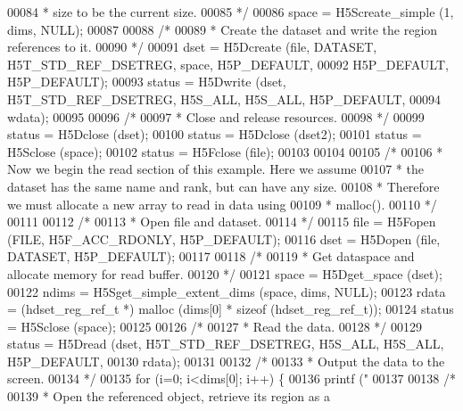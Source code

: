 \begin{DoxyCode}
00084 \textcolor{comment}{     * size to be the current size.}
00085 \textcolor{comment}{     */}
00086     space = H5Screate\_simple (1, dims, NULL);
00087 
00088     \textcolor{comment}{/*}
00089 \textcolor{comment}{     * Create the dataset and write the region references to it.}
00090 \textcolor{comment}{     */}
00091     dset = H5Dcreate (file, DATASET, H5T\_STD\_REF\_DSETREG, space, H5P\_DEFAULT,
00092                 H5P\_DEFAULT, H5P\_DEFAULT);
00093     status = H5Dwrite (dset, H5T\_STD\_REF\_DSETREG, H5S\_ALL, H5S\_ALL, H5P\_DEFAULT,
00094                 wdata);
00095 
00096     \textcolor{comment}{/*}
00097 \textcolor{comment}{     * Close and release resources.}
00098 \textcolor{comment}{     */}
00099     status = H5Dclose (dset);
00100     status = H5Dclose (dset2);
00101     status = H5Sclose (space);
00102     status = H5Fclose (file);
00103 
00104 
00105     \textcolor{comment}{/*}
00106 \textcolor{comment}{     * Now we begin the read section of this example.  Here we assume}
00107 \textcolor{comment}{     * the dataset has the same name and rank, but can have any size.}
00108 \textcolor{comment}{     * Therefore we must allocate a new array to read in data using}
00109 \textcolor{comment}{     * malloc().}
00110 \textcolor{comment}{     */}
00111 
00112     \textcolor{comment}{/*}
00113 \textcolor{comment}{     * Open file and dataset.}
00114 \textcolor{comment}{     */}
00115     file = H5Fopen (FILE, H5F\_ACC\_RDONLY, H5P\_DEFAULT);
00116     dset = H5Dopen (file, DATASET, H5P\_DEFAULT);
00117 
00118     \textcolor{comment}{/*}
00119 \textcolor{comment}{     * Get dataspace and allocate memory for read buffer.}
00120 \textcolor{comment}{     */}
00121     space = H5Dget\_space (dset);
00122     ndims = H5Sget\_simple\_extent\_dims (space, dims, NULL);
00123     rdata = (hdset\_reg\_ref\_t *) malloc (dims[0] * \textcolor{keyword}{sizeof} (hdset\_reg\_ref\_t));
00124     status = H5Sclose (space);
00125 
00126     \textcolor{comment}{/*}
00127 \textcolor{comment}{     * Read the data.}
00128 \textcolor{comment}{     */}
00129     status = H5Dread (dset, H5T\_STD\_REF\_DSETREG, H5S\_ALL, H5S\_ALL, H5P\_DEFAULT,
00130                 rdata);
00131 
00132     \textcolor{comment}{/*}
00133 \textcolor{comment}{     * Output the data to the screen.}
00134 \textcolor{comment}{     */}
00135     \textcolor{keywordflow}{for} (i=0; i<dims[0]; i++) \{
00136         printf (\textcolor{stringliteral}{"%
00137 
00138         \textcolor{comment}{/*}
00139 \textcolor{comment}{         * Open the referenced object, retrieve its region as a}
}
\end{DoxyCode}
